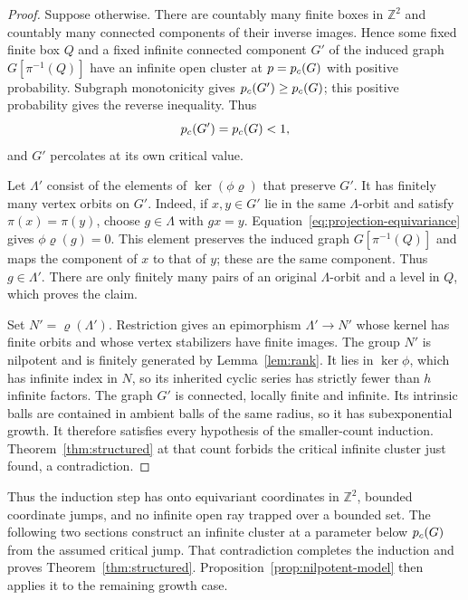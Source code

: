\begin{proof}
Suppose otherwise. There are countably many finite boxes in
$\mathbb Z^2$ and countably many connected components of their inverse
images. Hence some fixed finite box $Q$ and a fixed infinite connected
component $G'$ of the induced graph $G[\pi^{-1}(Q)]$ have an infinite
open cluster at $p=p_c(G)$ with positive probability. Subgraph
monotonicity gives $p_c(G')\ge p_c(G)$; this positive probability
gives the reverse inequality. Thus
\[
 p_c(G')=p_c(G)<1,
\]
and $G'$ percolates at its own critical value.

Let $\Lambda'$ consist of the elements of $\ker(\phi\varrho)$ that
preserve $G'$. It has finitely many vertex orbits on $G'$. Indeed,
if $x,y\in G'$ lie in the same $\Lambda$-orbit and satisfy
$\pi(x)=\pi(y)$, choose $g\in\Lambda$ with $gx=y$.
Equation~\eqref{eq:projection-equivariance} gives
$\phi\varrho(g)=0$. This element preserves the induced graph
$G[\pi^{-1}(Q)]$ and maps the component of $x$ to that of $y$;
these are the same component. Thus $g\in\Lambda'$. There are only
finitely many pairs of an original $\Lambda$-orbit and a level in $Q$,
which proves the claim.

Set $N'=\varrho(\Lambda')$. Restriction gives an epimorphism
$\Lambda'\to N'$ whose kernel has finite orbits and whose vertex
stabilizers have finite images. The group $N'$ is nilpotent and is
finitely generated by Lemma~\ref{lem:rank}. It lies in $\ker\phi$,
which has infinite index in $N$, so its inherited cyclic series has
strictly fewer than $h$ infinite factors. The graph $G'$ is connected,
locally finite and infinite. Its intrinsic balls are contained in
ambient balls of the same radius, so it has subexponential growth.
It therefore satisfies every hypothesis of the smaller-count
induction. Theorem~\ref{thm:structured} at that count forbids the
critical infinite cluster just found, a contradiction.
\end{proof}

Thus the induction step has onto equivariant coordinates in
\(\mathbb Z^2\), bounded coordinate jumps, and no infinite open ray
trapped over a bounded set. The following two sections construct an
infinite cluster at a parameter below \(p_c(G)\) from the assumed
critical jump. That contradiction completes the induction and proves
Theorem~\ref{thm:structured}. Proposition~\ref{prop:nilpotent-model}
then applies it to the remaining growth case.

